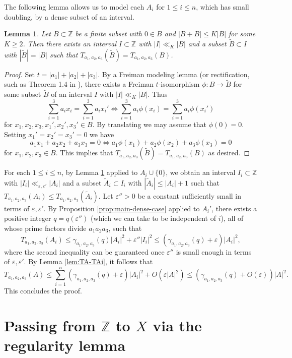 \documentclass[12pt, notitlepage]{amsart}
\numberwithin{equation}{section}
\def\Z{\mathbb Z}
\def\wt{\widetilde}
\newcommand{\eps}{\varepsilon}
\newtheorem{lemma}[theorem]{Lemma}
\theoremstyle{remark}
\theoremstyle{definition}
\theoremstyle{remark}
\numberwithin{equation}{section}
\begin{document}
The following lemma allows us to model each $A_i$ for $1 \leq i \leq n$, which has small doubling, by a dense subset of an interval. 

\begin{lemma}\label{lem:rectification}
Let $B \subset \Z$ be a finite subset with $0 \in B$ and $|B+B| \leq K|B|$ for some $K \geq 2$. Then there exists an interval $I \subset \Z$ with $|I| \ll_K |B|$ and a subset $\wt{B} \subset I$ with $|\wt{B}| = |B|$ such that $T_{a_1,a_2,a_3}(\wt{B}) = T_{a_1,a_2,a_3}(B)$.
\end{lemma}

\begin{proof}
Set $t = |a_1| + |a_2| + |a_3|$. By a Freiman modeling lemma (or rectification, such as Theorem 1.4 in \cite{GreenRuzsa}), there exists a Freiman $t$-isomorphism $\phi: B \rightarrow \wt{B}$ for some subset $\wt{B}$ of an interval $I$ with $|I| \ll_K |B|$. Thus
$$
\sum_{i=1}^3a_ix_i= \sum_{i=1}^3a_ix_i' \Longleftrightarrow \sum_{i=1}^3a_i\phi(x_i) = \sum_{i=1}^3a_i\phi(x_i')
$$
for $x_1,x_2,x_3,x_1',x_2',x_3' \in B$. By translating we may assume that $\phi(0) = 0$. Setting $x_1'=x_2'=x_3' = 0$ we have
$$
a_1x_1 + a_2x_2 + a_3x_3 = 0 \Longleftrightarrow a_1\phi(x_1) + a_2\phi(x_2) + a_3\phi(x_3) = 0
$$
for $x_1,x_2,x_3 \in B$. This implies that $T_{a_1,a_2,a_3}(\wt{B}) = T_{a_1,a_2,a_3}(B)$ as desired.    
\end{proof}

For each $1 \leq i \leq n$, by Lemma \ref{lem:rectification} applied to $A_i \cup \{0\}$, we obtain an interval $I_i \subset \Z$ with $|I_i| \ll_{\eps,\eps'} |A_i|$ and a subset $\wt{A}_i \subset I_i$ with $|\wt{A}_i| \leq |A_i|+1$ such that $T_{a_1,a_2,a_3}(A_i) \leq T_{a_1,a_2,a_3}(\wt{A}_i)$. Let $\eps'' > 0$ be a constant sufficiently small in terms of $\eps, \eps'$. By Proposition \ref{prop:main-dense-case} applied to $A_i'$, there exists a positive integer $q = q(\eps'')$ (which we can take to be independent of $i$), all of whose prime factors divide $a_1a_2a_3$, such that
$$
T_{a_1,a_2,a_3}(A_i) \leq \gamma_{a_1,a_2,a_3}(q)|A_i|^2 + \eps'' |I_i|^2 \leq (\gamma_{a_1,a_2,a_3}(q) + \eps)|A_i|^2,
$$
where the second inequality can be guaranteed once $\eps''$ is small enough in terms of $\eps, \eps'$. By Lemma \ref{lem:TA-TAi}, it follows that
$$
T_{a_1,a_2,a_3}(A) \leq \sum_{i=1}^n (\gamma_{a_1,a_2,a_3}(q) + \eps)|A_i|^2  + O(\eps |A|^2) \leq (\gamma_{a_1,a_2,a_3}(q) + O(\eps))|A|^2.
$$
This concludes the proof.

\section{Passing from $\Z$ to $X$ via the regularity lemma}\label{sec:proof2}
\end{document}

